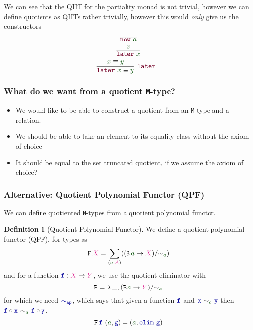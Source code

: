 \documentclass[xelatex,mathserif,serif,notheorems]{beamer} %
\theoremstyle{plain} %
\theoremstyle{definition}
\newtheorem{defn}[thm]{Definition}%
\theoremstyle{remark}
\newcommand*{\term}[1]{\textcolor{green!30!black}{#1}} %
\newcommand*{\type}[1]{\textcolor{magenta!90!black}{#1}}
\newcommand*{\relation}[1]{\textcolor{gray!75!black}{\ensuremath{\mathtt{#1}}}}
\newcommand*{\function}[1]{\textcolor{blue!60!black}{\ensuremath{\mathtt{#1}}}}
\newcommand*{\constructor}[1]{\textcolor{purple!60!black}{\ensuremath{\mathtt{#1}}}}
\newcommand*{\typeformer}[1]{\ensuremath{\mathtt{#1}}}
\newcommand*{\functor}[1]{\ensuremath{\mathbf{\mathtt{#1}}}}
\newcommand{\setlengths}{
  \setlength{\abovedisplayskip}{4pt}
  \setlength{\belowdisplayskip}{4pt}
  \setlength{\abovedisplayshortskip}{2pt}
  \setlength{\belowdisplayshortskip}{2pt}
}
\begin{document}
\begin{frame}
  We can see that the QIIT for the partiality monad is not trivial, however we can define quotients as QIITs rather trivially, however this would \emph{only} give us the constructors
  \begin{equation}
    \vcenter{\infer{\constructor{now}~\term{a}}{}}
  \end{equation}
  \begin{equation}
    \vcenter{\infer{\constructor{later}~\term{x}}{\term{x}}}
  \end{equation}
  \begin{equation}
    \vcenter{\infer[\constructor{later_{\equiv}}]{\constructor{later}~\term{x} \equiv \term{y}}{\term{x} \equiv \term{y}}}
  \end{equation}
\end{frame}

\begin{frame}
  \frametitle{What do we want from a quotient \texttt{M}-type?}
  \begin{itemize}
  \item We would like to be able to construct a quotient from an \texttt{M}-type and a relation.
  \item We should be able to take an element to its equality class without the axiom of choice
  \item It should be equal to the set truncated quotient, if we assume the axiom of choice?
  \end{itemize}
\end{frame}

\begin{frame}
  \frametitle{Alternative: Quotient Polynomial Functor (QPF)}
  We can define quotiented \texttt{M}-types from a quotient polynomial functor.
  \begin{defn}[Quotient Polynomial Functor]\setlengths
    We define a quotient polynomial functor (QPF), for types as
    \begin{equation}
      \functor{F}\,\type{X} =  \sum_{(\term{a} : \type{A})} ((\typeformer{B}\,\term{a} \rightarrow \type{X}) / \relation{\sim}_{\term{a}})
    \end{equation}
    and for a function \(\function{f} : \type{X} \rightarrow \type{Y}\), we use the quotient eliminator with
    \begin{equation}
      \typeformer{P} = \lambda\,\_, (\typeformer{B}\,\term{a} \rightarrow \type{Y})/\relation{\sim}_{\term{a}}
    \end{equation}
    for which we need \(\function{\sim_{ap}}\), which says that given a function \(\function{f}\) and \(\function{x}~\relation{\sim}_{\term{a}}~\function{y}\) then \(\function{f} \circ \function{x}~\relation{\sim}_{\term{a}}~\function{f} \circ \function{y}\).
    \begin{equation}
      \functor{F}\,\function{f}~(\term{a} , \function{g}) = (\term{a} , \function{elim}~\function{g})
    \end{equation}
  \end{defn}
\end{frame}
\end{document}
